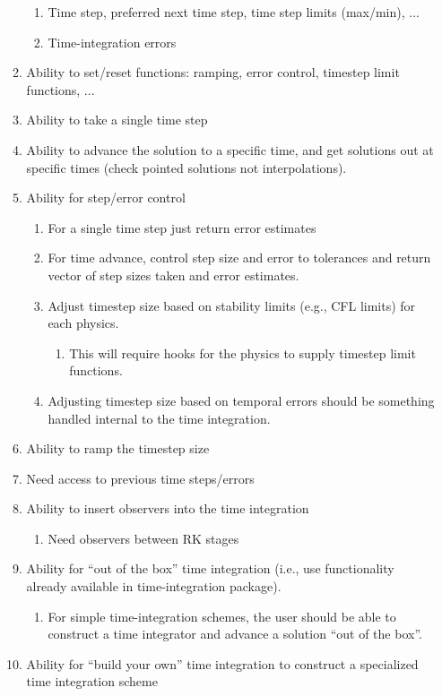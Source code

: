 \begin{enumerate}
\begin{enumerate}
\begin{enumerate}
\item Time step, preferred next time step, time step limits (max/min), ...
\item Time-integration errors
\end{enumerate}
\item Ability to set/reset functions: ramping, error control, timestep limit
functions, ...
\item Ability to take a single time step
\item Ability to advance the solution to a specific time, and get solutions
out at specific times (check pointed solutions not interpolations).
\item Ability for step/error control

\begin{enumerate}
\item For a single time step just return error estimates
\item For time advance, control step size and error to tolerances and return
vector of step sizes taken and error estimates.
\item Adjust timestep size based on stability limits (e.g., CFL limits)
for each physics.

\begin{enumerate}
\item This will require hooks for the physics to supply timestep limit functions.
\end{enumerate}
\item Adjusting timestep size based on temporal errors should be something
handled internal to the time integration.
\end{enumerate}
\item Ability to ramp the timestep size
\item Need access to previous time steps/errors
\item Ability to insert observers into the time integration

\begin{enumerate}
\item Need observers between RK stages
\end{enumerate}
\item Ability for ``out of the box'' time integration (i.e., use functionality
already available in time-integration package).

\begin{enumerate}
\item For simple time-integration schemes, the user should be able to construct
a time integrator and advance a solution ``out of the box''.
\end{enumerate}
\item Ability for ``build your own'' time integration to construct a specialized
time integration scheme


\end{enumerate}
\end{enumerate}
